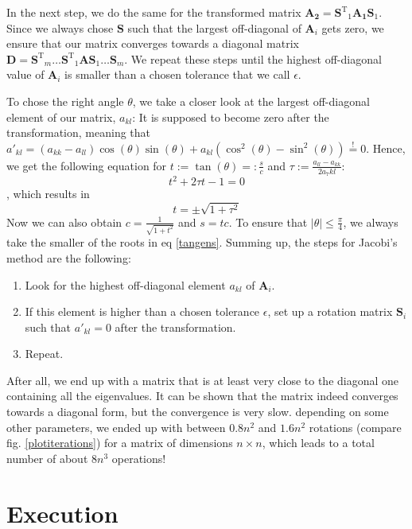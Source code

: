 \documentclass[10pt,a4paper]{article}
\begin{document}
In the next step, we do the same for the transformed matrix $\mathbf{A_2}=\mathbf{S^{\mathrm{T}}}_1\mathbf{A_1}\mathbf{S}_1$. Since we always chose $\mathbf{S}$ such that the largest off-diagonal of $\mathbf{A}_i$ gets zero, we ensure that our matrix converges towards a diagonal matrix $\mathbf{D}=\mathbf{S^{\mathrm{T}}}_m\dots\mathbf{S^{\mathrm{T}}}_1\mathbf{A}\mathbf{S}_1\dots\mathbf{S}_m$. We repeat these steps until the highest off-diagonal value of $\mathbf{A}_i$ is smaller than a chosen tolerance that we call $\epsilon$.

To chose the right angle $\theta$, we take a closer look at the largest off-diagonal element of our matrix, $a_{kl}$: It is supposed to become zero after the transformation, meaning that $a'_{kl}=\left(a_{kk}-a_{ll}\right)\cos(\theta)\sin(\theta)+a_{kl}\left(\cos^2(\theta)-\sin^2(\theta)\right)\overset{!}{=}0$. Hence, we get the following equation for $t:=\tan(\theta)=:\frac{s}{c}$ and $\tau:=\frac{a_{ll}-a_{kk}}{2a_7kl}$:
\begin{equation}
t^2+2\tau t-1=0
\end{equation}, which results in
\begin{equation}\label{tangens}
t=\pm\sqrt{1+\tau^2}
\end{equation}
Now we can also obtain $c=\frac{1}{\sqrt{1+t^2}}$ and $s=tc$. To ensure that $|\theta|\le\frac{\pi}{4}$, we always take the smaller of the roots in eq \eqref{tangens}.
Summing up, the steps for Jacobi's method are the following:
\begin{enumerate}
	\item Look for the highest off-diagonal element $a_{kl}$ of $\mathbf{A}_i$.
	\item If this element is higher than a chosen tolerance $\epsilon$, set up a rotation matrix $\mathbf{S}_i$ such that $a'_{kl}=0$ after the transformation.
	\item Repeat.
\end{enumerate}
After all, we end up with a matrix that is at least very close to the diagonal one containing all the eigenvalues. It can be shown that the matrix indeed converges towards a diagonal form, but the convergence is very slow. depending on some other parameters, we ended up with between $0.8n^2$ and $1.6n^2$ rotations (compare fig. \ref{plotiterations}) for a matrix of dimensions $n\times n$, which leads to a total number of about $8n^3$ operations!
\section{Execution}
\end{document}
